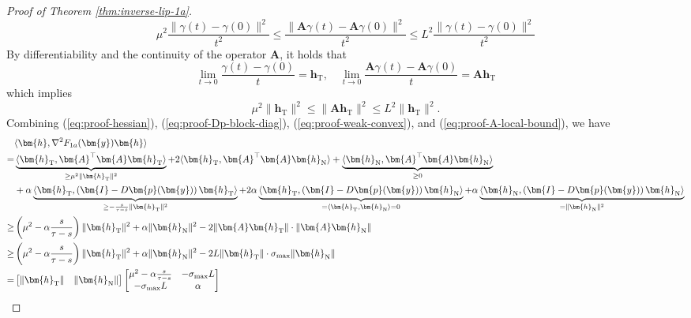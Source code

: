 \documentclass{amsart} %
\def\eqref#1{equation~\ref{#1}}
\def\vh{{\bm{h}}}
\def\vp{{\bm{p}}}
\def\vy{{\bm{y}}}
\def\mA{{\bm{A}}}
\def\mI{{\bm{I}}}
\theoremstyle{definition}
\theoremstyle{remark}
\renewcommand{\eqref}[1]{\textup{(\ref{#1})}}
\begin{document}
\begin{proof}[Proof of Theorem \ref{thm:inverse-lip-1a}]
\[ \mu^2 \frac{\|\gamma(t)-\gamma(0)\|^2}{t^2} \leq \frac{\|\mA \gamma(t) - \mA\gamma(0)\|^2}{t^2} \leq L^2 \frac{\|\gamma(t)-\gamma(0)\|^2}{t^2} \]
By differentiability and the continuity of the operator $\mA$, it holds that 
\[\lim_{t \to 0} \frac{\gamma(t)-\gamma(0)}{t} = \vh_{\mathrm{T}} , \quad \lim_{t \to 0} \frac{\mA\gamma(t)-\mA\gamma(0)}{t} = \mA\vh_{\mathrm{T}}\]
which implies
\begin{equation}
\label{eq:proof-A-local-bound}
\mu^2 \|\vh_{\mathrm{T}} \|^2 \leq \| \mA\vh_{\mathrm{T}} \|^2 \leq L^2 \| \vh_{\mathrm{T}} \|^2.
\end{equation}
Combining \eqref{eq:proof-hessian}, \eqref{eq:proof-Dp-block-diag}, \eqref{eq:proof-weak-convex}, and \eqref{eq:proof-A-local-bound}, we have
\begin{align*}
& \langle \vh, \nabla^2 F_{1a}(\vy) \vh \rangle \\
= & \underbrace{\langle \vh_{\mathrm{T}}, \mA^\top\mA \vh_{\mathrm{T}} \rangle}_{\geq \mu^2 \|\vh_{\mathrm{T}} \|^2}  
+ 2 \langle \vh_{\mathrm{T}}, \mA^\top\mA \vh_{\mathrm{N}} \rangle 
+ \underbrace{\langle \vh_{\mathrm{N}}, \mA^\top\mA \vh_{\mathrm{N}} \rangle}_{\geq 0} \\
& + \alpha \underbrace{\langle \vh_{\mathrm{T}}, \left( \mI - D \vp(\vy) \right) \vh_{\mathrm{T}} \rangle}_{\geq - \frac{s}{\tau - s} \|\vh_{\mathrm{T}} \|^2 }  
+ 2 \alpha \underbrace{ \langle \vh_{\mathrm{T}}, \left( \mI - D \vp(\vy) \right) \vh_{\mathrm{N}} \rangle}_{=\langle \vh_{\mathrm{T}}, \vh_{\mathrm{N}} \rangle = 0 } 
+ \alpha \underbrace{ \langle \vh_{\mathrm{N}}, \left( \mI - D \vp(\vy) \right) \vh_{\mathrm{N}} \rangle}_{=\|\vh_{\mathrm{N}} \|^2} \\
\geq & \left(\mu^2 - \alpha \frac{s}{\tau - s} \right) \|\vh_{\mathrm{T}} \|^2 + \alpha \|\vh_{\mathrm{N}} \|^2 - 2 \|\mA\vh_{\mathrm{T}}\| \cdot \|\mA\vh_{\mathrm{N}}\| \\
\geq & \left(\mu^2 - \alpha \frac{s}{\tau - s} \right) \|\vh_{\mathrm{T}} \|^2 + \alpha \|\vh_{\mathrm{N}} \|^2 - 2  L \|\vh_{\mathrm{T}}\| \cdot \sigma_{\textup{max}} \|\vh_{\mathrm{N}}\| \\
= & \begin{bmatrix}
     \|\vh_{\mathrm{T}}\| &  \|\vh_{\mathrm{N}}\|
\end{bmatrix}
\begin{bmatrix}
     \mu^2 - \alpha \frac{s}{\tau - s} & - \sigma_{\textup{max}} L \\ 
     - \sigma_{\textup{max}} L & \alpha
\end{bmatrix}

\end{align*}
\end{proof}
\end{document}
